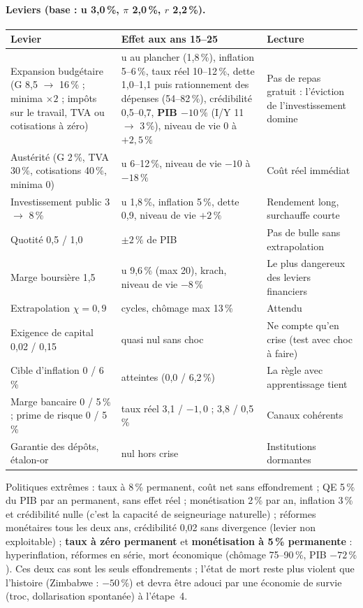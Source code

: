 \documentclass[11pt,a4paper]{article}
\begin{document}
\paragraph{Leviers (base : u 3,0\,\%, $\pi$ 2,0\,\%, $r$ 2,2\,\%).}
\begin{center}\small
\begin{tabular}{p{4.6cm}p{6.2cm}p{4.2cm}}
\toprule
\textbf{Levier} & \textbf{Effet aux ans 15--25} & \textbf{Lecture}\\
\midrule
Expansion budgétaire (G 8,5 $\to$ 16\,\% ; minima $\times2$ ; impôts sur le travail, TVA ou cotisations à zéro) & u au plancher (1,8\,\%), inflation 5--6\,\%, taux réel 10--12\,\%, dette 1,0--1,1 puis rationnement des dépenses (54--82\,\%), crédibilité 0,5--0,7, \textbf{PIB $-10\,\%$} (I/Y 11 $\to$ 3\,\%), niveau de vie 0 à $+2{,}5\,\%$ & Pas de repas gratuit : l'éviction de l'investissement domine\\
Austérité (G 2\,\%, TVA 30\,\%, cotisations 40\,\%, minima 0) & u 6--12\,\%, niveau de vie $-10$ à $-18\,\%$ & Coût réel immédiat\\
Investissement public 3 $\to$ 8\,\% & u 1,8\,\%, inflation 5\,\%, dette 0,9, niveau de vie $+2\,\%$ & Rendement long, surchauffe courte\\
Quotité 0,5 / 1,0 & $\pm2\,\%$ de PIB & Pas de bulle sans extrapolation\\
Marge boursière 1,5 & u 9,6\,\% (max 20), krach, niveau de vie $-8\,\%$ & Le plus dangereux des leviers financiers\\
Extrapolation $\chi=0{,}9$ & cycles, chômage max 13\,\% & Attendu\\
Exigence de capital 0,02 / 0,15 & quasi nul sans choc & Ne compte qu'en crise (test avec choc à faire)\\
Cible d'inflation 0 / 6\,\% & atteintes (0,0 / 6,2\,\%) & La règle avec apprentissage tient\\
Marge bancaire 0 / 5\,\% ; prime de risque 0 / 5\,\% & taux réel 3,1 / $-1{,}0$ ; 3,8 / 0,5\,\% & Canaux cohérents\\
Garantie des dépôts, étalon-or & nul hors crise & Institutions dormantes\\
\bottomrule
\end{tabular}
\end{center}
Politiques extrêmes : taux à 8\,\% permanent, coût net sans effondrement ; QE 5\,\% du PIB par an permanent, sans effet réel ; monétisation 2\,\% par an, inflation 3\,\% et crédibilité nulle (c'est la capacité de seigneuriage naturelle) ; réformes monétaires tous les deux ans, crédibilité 0,02 sans divergence (levier non exploitable) ; \textbf{taux à zéro permanent} et \textbf{monétisation à 5\,\% permanente} : hyperinflation, réformes en série, mort économique (chômage 75--90\,\%, PIB $-72\,\%$). Ces deux cas sont les seuls effondrements ; l'état de mort reste plus violent que l'histoire (Zimbabwe : $-50\,\%$) et devra être adouci par une économie de survie (troc, dollarisation spontanée) à l'étape~4.
\end{document}
